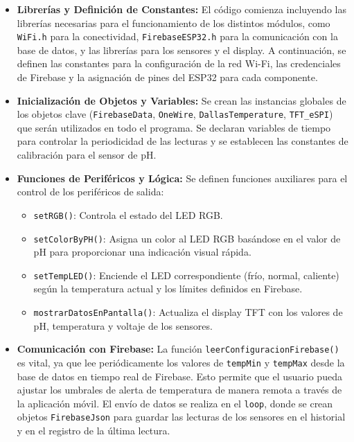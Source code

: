 \documentclass[a4paper,12pt]{article}
\begin{document}
	\begin{itemize}
		\item \textbf{Librerías y Definición de Constantes:} El código comienza incluyendo las librerías necesarias para el funcionamiento de los distintos módulos, como \texttt{WiFi.h} para la conectividad, \texttt{FirebaseESP32.h} para la comunicación con la base de datos, y las librerías para los sensores y el display. A continuación, se definen las constantes para la configuración de la red Wi-Fi, las credenciales de Firebase y la asignación de pines del ESP32 para cada componente.
		
		\item \textbf{Inicialización de Objetos y Variables:} Se crean las instancias globales de los objetos clave (\texttt{FirebaseData}, \texttt{OneWire}, \texttt{DallasTemperature}, \texttt{TFT\_eSPI}) que serán utilizados en todo el programa. Se declaran variables de tiempo para controlar la periodicidad de las lecturas y se establecen las constantes de calibración para el sensor de pH.
		
		\item \textbf{Funciones de Periféricos y Lógica:} Se definen funciones auxiliares para el control de los periféricos de salida:
		\begin{itemize}
			\item \texttt{setRGB()}: Controla el estado del LED RGB.
			\item \texttt{setColorByPH()}: Asigna un color al LED RGB basándose en el valor de pH para proporcionar una indicación visual rápida.
			\item \texttt{setTempLED()}: Enciende el LED correspondiente (frío, normal, caliente) según la temperatura actual y los límites definidos en Firebase.
			\item \texttt{mostrarDatosEnPantalla()}: Actualiza el display TFT con los valores de pH, temperatura y voltaje de los sensores.
		\end{itemize}
		
		\item \textbf{Comunicación con Firebase:} La función \texttt{leerConfiguracionFirebase()} es vital, ya que lee periódicamente los valores de \texttt{tempMin} y \texttt{tempMax} desde la base de datos en tiempo real de Firebase. Esto permite que el usuario pueda ajustar los umbrales de alerta de temperatura de manera remota a través de la aplicación móvil. El envío de datos se realiza en el \texttt{loop}, donde se crean objetos \texttt{FirebaseJson} para guardar las lecturas de los sensores en el historial y en el registro de la última lectura.
		

\end{itemize}
\end{document}
